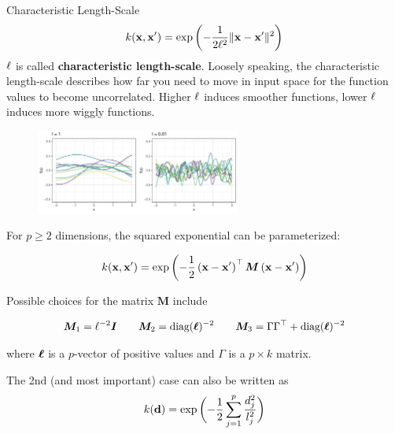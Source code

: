 \begin{frame}[c,allowframebreaks]{Characteristic Length-Scale}
    $$k(\mathbf{x}, \mathbf{x}^\prime) = \exp\left(-\frac{1}{2\ell^2}\|\mathbf{x} - \mathbf{x}^\prime\|^2\right)$$
$\ell$ is called \textbf{characteristic length-scale}. Loosely speaking, the characteristic length-scale describes how far you need to move in input space for the function values to become uncorrelated. Higher $\ell$ induces smoother functions, lower $\ell$ induces more wiggly functions.

\begin{figure}
\includegraphics[width=0.6\textwidth]{figure_man/gp-sqexp-l-1.pdf}
\end{figure}


\framebreak

For $p \geq 2$ dimensions, the squared exponential can be parameterized:

$$
k(\mathbf{x}, \mathbf{x}^\prime) = \exp\,\biggl(- \frac{1}{2}\left(\mathbf{x} - \mathbf{x}^\prime\right)^\top\bm{M}\left(\mathbf{x} - \mathbf{x}^\prime \right)\biggr)
$$

Possible choices for the matrix $\bm{M}$ include

$$
\bm{M}_1 = \ell^{-2}\boldsymbol{I} \qquad \bm{M}_2 = \text{diag}(\bm{\ell})^{-2} \qquad \bm{M}_3 = \Gamma \Gamma^\top + \text{diag}(\bm{\ell})^{-2}
$$

where $\bm{\ell}$ is a $p$-vector of positive values and $\Gamma$ is a $p \times k$ matrix. 

\lz

The 2nd (and most important) case can also be written as 
$$
  k(\bold{d}) = \exp\,\biggl(- \frac{1}{2} \sum\limits_{j=1}^p \frac{d_j^2}{l_j^2} \biggr)
$$


\end{frame}
